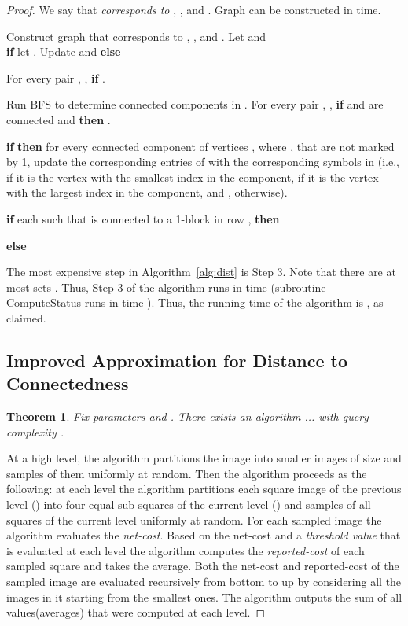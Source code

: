 \documentclass[11pt,english]{article}
\newtheorem{theorem}{Theorem}[section]
\numberwithin{figure}{section}
\newcommand{\Compst}{{\sf ComputeStatus}\xspace}
\begin{document}
\begin{proof}
We say that  {\em corresponds to} , , and . Graph  can be constructed in  time.

\begin{algorithm}\label{alg:conf}
\caption{Subroutine \Compst used in Algorithm~\ref{alg:dist}.}
\label{alg:conf}
\DontPrintSemicolon
\BlankLine


\nl Construct graph  that corresponds to , , and . Let  and \\
\nl \textbf{if}  let . Update  and  \textbf{else} 

\nl For every pair , , \textbf{if}   .

\nl Run BFS to determine connected components in . For every pair , , \textbf{if}  and  are connected and  \textbf{then} .

\nl \textbf{if}  \textbf{then} for every connected component of vertices , where , that are not marked by 1, update the corresponding entries of  with the corresponding symbols in  (i.e.,  if it is the vertex with the smallest index in the component,  if it is the vertex with the largest index in the component, and , otherwise).

\nl \textbf{if} each  such that  is connected to a 1-block in row , \textbf{then} \Return 

\nl \textbf{else} \Return 

\end{algorithm}
The most expensive step in Algorithm~\ref{alg:dist} is Step 3. Note that there are at most  sets . Thus, Step 3 of the algorithm runs in time  (subroutine \Compst runs in time ). Thus, the running time of the algorithm is , as claimed.


\subsection{Improved Approximation for Distance to Connectedness}\label{sec:improved-approximation-for-connectedness}
\begin{theorem}
Fix parameters  and . There exists an algorithm ...
with query complexity .
\end{theorem}
At a high level, the algorithm partitions the image into smaller images of size  and samples  of them uniformly at random. Then the algorithm proceeds as the following: at each level  the algorithm partitions each square image of the previous level () into four equal sub-squares of the current level () and samples  of all squares of the current level uniformly at random. For each sampled image the algorithm evaluates the \emph{net-cost}. Based on the net-cost and a \emph{threshold value} that is evaluated at each level the algorithm computes the \emph{reported-cost} of each sampled square and takes the average. Both the net-cost and reported-cost of the sampled image are evaluated recursively from bottom to up by considering all the images in it starting from the smallest ones. The algorithm outputs the sum of all values(averages) that were computed at each level.


\end{proof}
\end{document}
